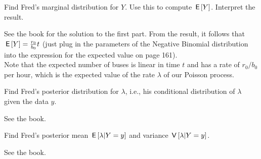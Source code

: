 \begin{exercise}
Find Fred's marginal distribution for $Y$. Use this to compute $\,\mathsf{E}\left[Y\right]$. Interpret the result.
\begin{solution}
See the book for the solution to the first part. From the result, it follows that $\,\mathsf{E}\left[Y\right] = \frac{r_0}{b_0} t$ (just plug in the parameters of the Negative Binomial distribution into the expression for the expected value on page 161).\\
Note that the expected number of buses is linear in time $t$ and has a rate of $r_0/b_0$ per hour, which is the expected value of the rate $\lambda$ of our Poisson process.
\end{solution}
\end{exercise}

\begin{exercise}
Find Fred's posterior distribution for $\lambda$, i.e., his conditional distribution of $\lambda$ given the data $y$.
\begin{solution}
See the book.
\end{solution}
\end{exercise}

\begin{exercise}
Find Fred's posterior mean $\,\mathsf{E}\left[\lambda | Y = y\right]$ and variance $\,\mathsf{V}\left[\lambda|Y=y\right]$.
\begin{solution}
See the book.
\end{solution}
\end{exercise}

\begin{comment}
\end{comment}


